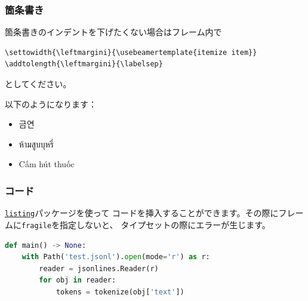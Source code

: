\documentclass[%
    hyperref={%
        colorlinks,
        linkcolor=sDarkBlue,
        urlcolor=sDarkBlue,
        citecolor=sDarkBlue
    },
    aspectratio=169
]{beamer}
\begin{document}
    \begin{frame}[fragile]
        \frametitle{箇条書き}
        \addtolength{\leftmargini}{\labelsep}
        箇条書きのインデントを下げたくない場合はフレーム内で
        \begin{leftbar}
\begin{lstlisting}
\settowidth{\leftmargini}{\usebeamertemplate{itemize item}}
\addtolength{\leftmargini}{\labelsep}
\end{lstlisting}
        \end{leftbar}
        としてください。

        \bigskip

        以下のようになります：

        \smallskip

        \begin{itemize}
            \item \begin{korean}금연\end{korean}
            \item \begin{thai}
ห้ามสูบบุหรี่
            \end{thai}
            \item \begin{vietnamese}
Cấm hút thuốc
            \end{vietnamese}
        \end{itemize}

    \end{frame}


    \begin{frame}[fragile]
        \frametitle{コード}
        \href{https://ctan.org/pkg/listings?lang=en}{\texttt{listing}}パッケージを使って
        コードを挿入することができます。その際にフレームに\texttt{fragile}を指定しないと、
        タイプセットの際にエラーが生じます。
    \begin{leftbar}
\begin{lstlisting}[language=Python]
def main() -> None:
    with Path('test.jsonl').open(mode='r') as r:
        reader = jsonlines.Reader(r)
        for obj in reader:
            tokens = tokenize(obj['text'])
\end{lstlisting}
    \end{leftbar}
    \end{frame}
\end{document}
